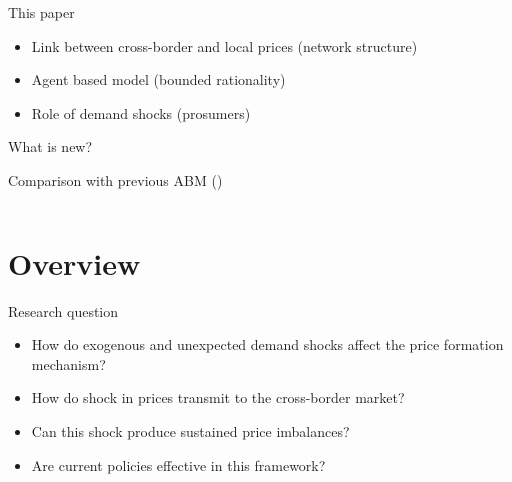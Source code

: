 \documentclass{beamer}
\begin{document}
\begin{frame}{This paper}
    \begin{itemize} \setlength\itemsep{1.5em}
        \item Link between cross-border and local prices (network structure)
        \item Agent based model (bounded rationality)
        \item Role of demand shocks (prosumers)
    \end{itemize}
\end{frame}

\begin{frame}{What is new?}

    Comparison with previous ABM (\cite{Weidlich2008})
    \vfill

    \begin{columns}[T,onlytextwidth]

        \begin{column}{.4\textwidth}
            \centering
            \resizebox{\textwidth}{!}{}
        \end{column}

        \hfill

        \begin{column}{.57\textwidth}
            \centering
            \resizebox{\textwidth}{!}{}
        \end{column}
    \end{columns}

\end{frame}

\section{Overview}

\begin{frame}{Research question}

    \begin{itemize} \setlength{\itemsep}{1em}
        \item How do exogenous and unexpected demand shocks affect the price formation mechanism? \pause
        \item How do shock in prices transmit to the cross-border market? \pause
        \item Can this shock produce sustained price imbalances? \pause
        \item Are current policies effective in this framework?
    \end{itemize}

\end{frame}
\end{document}
